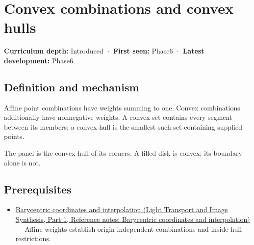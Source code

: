 \hypertarget{appendix-0026ec42c9d5}{}\label{referencestart:appendix-0026ec42c9d5}
\section{Convex combinations and convex hulls}\label{appendix-0026ec42c9d5-convex-combinations-and-convex-hulls}

\hypertarget{appendix-0026ec42c9d5-convex-combinations-and-convex-hulls}{}

\textbf{Curriculum depth:} Introduced · \textbf{First seen:} Phase6 · \textbf{Latest development:} Phase6

\begin{allmightroledefinition}

\subsection{Definition and mechanism}\label{appendix-0026ec42c9d5-definition-and-mechanism}

\hypertarget{appendix-0026ec42c9d5-definition-and-mechanism}{}

Affine point combinations have weights summing to one. Convex combinations additionally have nonnegative weights. A convex set contains every segment between its members; a convex hull is the smallest such set containing supplied points.

\end{allmightroledefinition}

The panel is the convex hull of its corners. A filled disk is convex; its boundary alone is not.

\subsection{Prerequisites}\label{appendix-0026ec42c9d5-prerequisites}

\hypertarget{appendix-0026ec42c9d5-prerequisites}{}

\begin{itemize}
\tightlist
\item
  \href{../04-Light-Transport-and-Image-Synthesis-P01/main.pdf\#nameddest=appendix-02b9d9a81dca}{Barycentric coordinates and interpolation (Light Transport and Image Synthesis, Part 1, Reference notes: Barycentric coordinates and interpolation)} --- Affine weights establish origin-independent combinations and inside-hull restrictions.
\end{itemize}

